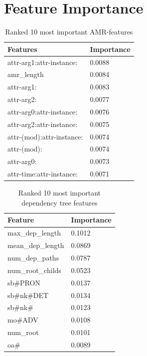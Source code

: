 \documentclass[11pt]{article}
\begin{document}
\section{Feature Importance}\label{appendix:feature-importance}

\begin{table}[ht]
    \centering\small
\begin{tabular}{ll}
\hline
Features & Importance \\ 
\hline
attr-arg1:attr-instance: & 0.0088 \\
amr\_length & 0.0084 \\
attr-arg1: & 0.0083 \\
attr-arg2: & 0.0077 \\
attr-arg0:attr-instance: & 0.0076 \\
attr-arg2:attr-instance: & 0.0075 \\
attr-(mod):attr-instance: & 0.0074 \\
attr-(mod): & 0.0074 \\
attr-arg0: & 0.0073 \\
attr-time:attr-instance: & 0.0071 \\
\hline
\end{tabular} 
\caption{Ranked 10 most important AMR-features}
    \label{tab:importanceAMR}
\end{table}

\begin{table}[ht]
    \centering\small
\begin{tabular}{ll}
\hline
Feature & Importance \\ 
\hline
max\_dep\_length & 0.1012 \\
mean\_dep\_length & 0.0869 \\
num\_dep\_paths & 0.0787 \\
num\_root\_childs & 0.0523 \\
sb\#PRON & 0.0137 \\
sb\#nk\#DET & 0.0134 \\
sb\#nk\# & 0.0123 \\
mo\#ADV & 0.0108 \\
num\_root & 0.0101 \\
oa\# & 0.0089 \\
\hline
\end{tabular} 
\caption{Ranked 10 most important dependency tree features}
    \label{tab:importanceDepTree}
\end{table}
\end{document}
